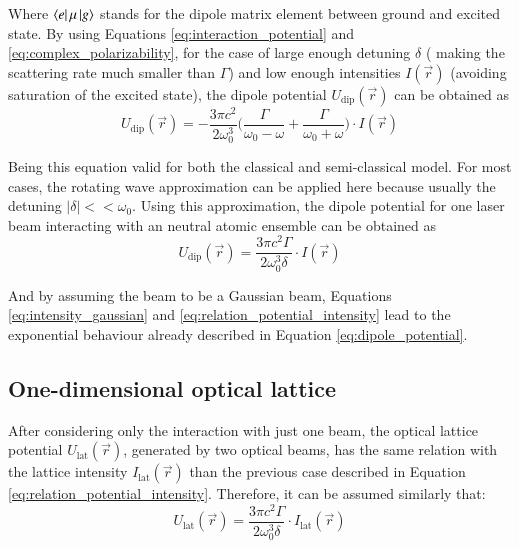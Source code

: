 Where $\bra{e}\mu\ket{g}$ stands for the dipole matrix element between ground and excited state. By using Equations \eqref{eq:interaction_potential} and \eqref{eq:complex_polarizability}, for the case of large enough detuning $\delta$ ( making the scattering rate much smaller than $\Gamma$) and low enough intensities $I(\vec{r})$ (avoiding saturation of the excited state), the dipole potential $U_{\text{dip}}(\vec{r})$ can be obtained as
\begin{equation}
	U_{\text{dip}}(\vec{r}) = -\frac{3\pi c^2}{2\omega_0^3} \bigg(\frac{\Gamma}{\omega_0-\omega} + \frac{\Gamma}{\omega_0+\omega}\bigg) \cdot I(\vec{r})
\end{equation} 

Being this equation valid for both the classical and semi-classical model. For most cases, the rotating wave approximation can be applied here because usually the detuning $\mathopen|\delta\mathclose| << \omega_0$. Using this approximation, the dipole potential for one laser beam interacting with an neutral atomic ensemble can be obtained as
\begin{equation}\label{eq:relation_potential_intensity}
	U_{\text{dip}}(\vec{r}) = \frac{3\pi c^2 \Gamma}{2\omega_0^3 \delta} \cdot I(\vec{r})
\end{equation} 

And by assuming the beam to be a Gaussian beam, Equations \eqref{eq:intensity_gaussian} and \eqref{eq:relation_potential_intensity} lead to the exponential behaviour already described in Equation \eqref{eq:dipole_potential}.

\pagebreak

\subsection{One-dimensional optical lattice}\label{subsec:One_dim_optical_lattice}

After considering only the interaction with just one beam, the optical lattice potential $U_\text{lat}(\vec{r})$, generated by two optical beams, has the same relation with the lattice intensity $I_\text{lat}(\vec{r})$ than the previous case described in Equation \eqref{eq:relation_potential_intensity}. Therefore, it can be assumed similarly that:
\begin{equation}\label{eq:relation_lattice_potential_intensity}
	U_{\text{lat}}(\vec{r}) = \frac{3\pi c^2 \Gamma}{2\omega_0^3 \delta} \cdot I_{\text{lat}}(\vec{r})
\end{equation} 

